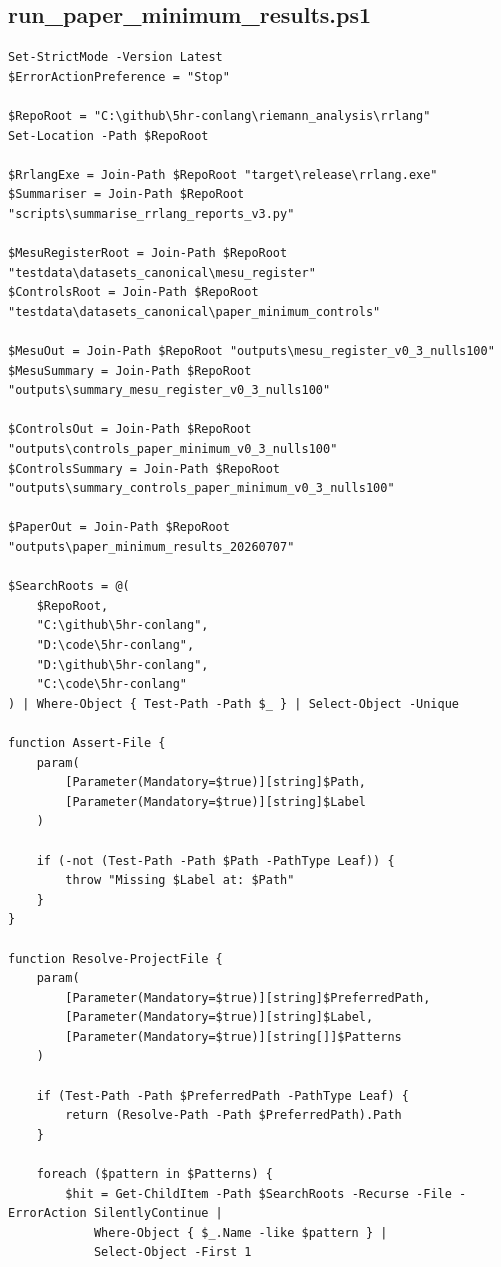 \documentclass[11pt,a4paper]{article}
\begin{document}
\subsection{run\_paper\_minimum\_results.ps1}
\begin{lstlisting}
Set-StrictMode -Version Latest
$ErrorActionPreference = "Stop"

$RepoRoot = "C:\github\5hr-conlang\riemann_analysis\rrlang"
Set-Location -Path $RepoRoot

$RrlangExe = Join-Path $RepoRoot "target\release\rrlang.exe"
$Summariser = Join-Path $RepoRoot "scripts\summarise_rrlang_reports_v3.py"

$MesuRegisterRoot = Join-Path $RepoRoot "testdata\datasets_canonical\mesu_register"
$ControlsRoot = Join-Path $RepoRoot "testdata\datasets_canonical\paper_minimum_controls"

$MesuOut = Join-Path $RepoRoot "outputs\mesu_register_v0_3_nulls100"
$MesuSummary = Join-Path $RepoRoot "outputs\summary_mesu_register_v0_3_nulls100"

$ControlsOut = Join-Path $RepoRoot "outputs\controls_paper_minimum_v0_3_nulls100"
$ControlsSummary = Join-Path $RepoRoot "outputs\summary_controls_paper_minimum_v0_3_nulls100"

$PaperOut = Join-Path $RepoRoot "outputs\paper_minimum_results_20260707"

$SearchRoots = @(
    $RepoRoot,
    "C:\github\5hr-conlang",
    "D:\code\5hr-conlang",
    "D:\github\5hr-conlang",
    "C:\code\5hr-conlang"
) | Where-Object { Test-Path -Path $_ } | Select-Object -Unique

function Assert-File {
    param(
        [Parameter(Mandatory=$true)][string]$Path,
        [Parameter(Mandatory=$true)][string]$Label
    )

    if (-not (Test-Path -Path $Path -PathType Leaf)) {
        throw "Missing $Label at: $Path"
    }
}

function Resolve-ProjectFile {
    param(
        [Parameter(Mandatory=$true)][string]$PreferredPath,
        [Parameter(Mandatory=$true)][string]$Label,
        [Parameter(Mandatory=$true)][string[]]$Patterns
    )

    if (Test-Path -Path $PreferredPath -PathType Leaf) {
        return (Resolve-Path -Path $PreferredPath).Path
    }

    foreach ($pattern in $Patterns) {
        $hit = Get-ChildItem -Path $SearchRoots -Recurse -File -ErrorAction SilentlyContinue |
            Where-Object { $_.Name -like $pattern } |
            Select-Object -First 1


\end{lstlisting}
\end{document}
